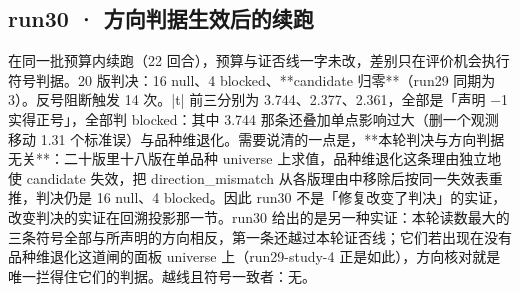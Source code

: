 \documentclass[11pt]{ctexart}
\begin{document}
\subsection{run30 · 方向判据生效后的续跑}
在同一批预算内续跑（22 回合），预算与证否线一字未改，差别只在评价机会执行符号判据。20 版判决：16 null、4 blocked、**candidate 归零**（run29 同期为 3）。反号阻断触发 14 次。|t| 前三分别为 3.744、2.377、2.361，全部是「声明 −1 实得正号」，全部判 blocked：其中 3.744 那条还叠加单点影响过大（删一个观测移动 1.31 个标准误）与品种维退化。需要说清的一点是，**本轮判决与方向判据无关**：二十版里十八版在单品种 universe 上求值，品种维退化这条理由独立地使 candidate 失效，把 direction\_mismatch 从各版理由中移除后按同一失效表重推，判决仍是 16 null、4 blocked。因此 run30 不是「修复改变了判决」的实证，改变判决的实证在回溯投影那一节。run30 给出的是另一种实证：本轮读数最大的三条符号全部与所声明的方向相反，第一条还越过本轮证否线；它们若出现在没有品种维退化这道闸的面板 universe 上（run29-study-4 正是如此），方向核对就是唯一拦得住它们的判据。越线且符号一致者：无。
\end{document}
